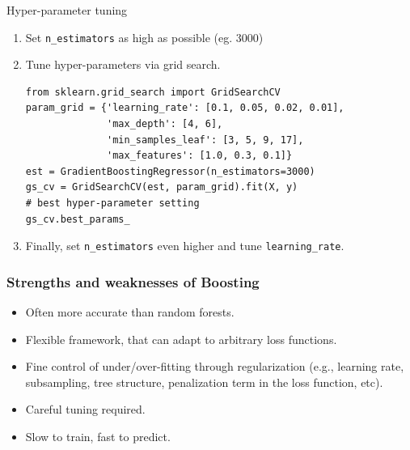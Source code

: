 \documentclass{beamer}
\begin{document}
\begin{frame}[fragile]{Hyper-parameter tuning}

\begin{enumerate}
  \item Set \texttt{n\_estimators} as high as possible (eg. $3000$)
  \vspace{0.2cm}
  \item Tune hyper-parameters via grid search.

\begin{verbatim}
from sklearn.grid_search import GridSearchCV
param_grid = {'learning_rate': [0.1, 0.05, 0.02, 0.01],
              'max_depth': [4, 6],
              'min_samples_leaf': [3, 5, 9, 17],
              'max_features': [1.0, 0.3, 0.1]}
est = GradientBoostingRegressor(n_estimators=3000)
gs_cv = GridSearchCV(est, param_grid).fit(X, y)
# best hyper-parameter setting
gs_cv.best_params_
\end{verbatim}
  \vspace{0.2cm}
  \item Finally, set \texttt{n\_estimators} even higher and tune \texttt{learning\_rate}.

\end{enumerate}
\end{frame}



\begin{frame}
  \frametitle{Strengths and weaknesses of Boosting}

  \begin{itemize}
        \item Often {\color{blue} more accurate} than random forests.

         \vspace{0.25cm}

        \item {\color{blue} Flexible framework}, that can adapt to arbitrary
              loss functions.

        \vspace{0.25cm}

        \item Fine control of under/over-fitting through {\color{blue}
              regularization} (e.g., learning rate, subsampling,
              tree structure, penalization term in the loss function, etc).

        \vspace{0.25cm}

        \item {\color{red} Careful tuning} required.

        \vspace{0.25cm}

        \item {\color{red} Slow} to train, {\color{blue} fast} to predict.
  \end{itemize}
\end{frame}
\end{document}
